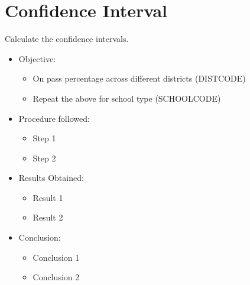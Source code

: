 \chapter{Confidence Interval}
Calculate the confidence intervals.
\begin{itemize}
	\item
	Objective:
	\begin{itemize}
		\item
		 On pass percentage across different districts (DIST\textunderscore CODE)
		\item
		 Repeat the above for school type (SCHOOL\textunderscore CODE)
	\end{itemize}
	
	\item
	Procedure followed: 
	\begin{itemize}
		\item
		Step 1
		\item
		Step 2
	\end{itemize}
	
	\item
	Results Obtained:
	\begin{itemize}
		\item
		Result 1
		\item
		Result 2
	\end{itemize}
	
	\item
	Conclusion:
	\begin{itemize}
		\item
		Conclusion 1
		\item
		Conclusion 2
	\end{itemize}
\end{itemize}